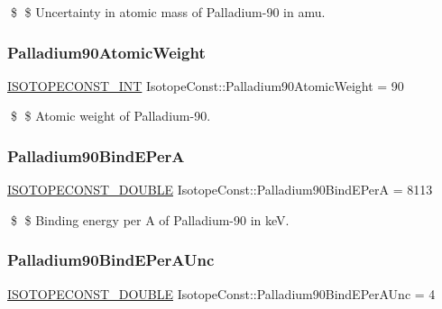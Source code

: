 \$ \$ Uncertainty in atomic mass of Palladium-\/90 in amu. \mbox{\label{group___isotope_const-_palladium-_pd90_ga247c13b93d691484c22de42ee18c9520}} 
\subsubsection{\texorpdfstring{Palladium90\+Atomic\+Weight}{Palladium90AtomicWeight}}
{\footnotesize\ttfamily \mbox{\hyperlink{group___isotope_const-_macros_ga5f18360b3e99483a35c32d789e62621c}{I\+S\+O\+T\+O\+P\+E\+C\+O\+N\+S\+T\+\_\+\+I\+NT}} Isotope\+Const\+::\+Palladium90\+Atomic\+Weight = 90}

\$ \$ Atomic weight of Palladium-\/90. \mbox{\label{group___isotope_const-_palladium-_pd90_ga45b9f9d9ab32f1104a08cf1b076faf8b}} 
\subsubsection{\texorpdfstring{Palladium90\+Bind\+E\+PerA}{Palladium90BindEPerA}}
{\footnotesize\ttfamily \mbox{\hyperlink{group___isotope_const-_macros_ga8f45a7272ce02c0b4c65c44636ed719a}{I\+S\+O\+T\+O\+P\+E\+C\+O\+N\+S\+T\+\_\+\+D\+O\+U\+B\+LE}} Isotope\+Const\+::\+Palladium90\+Bind\+E\+PerA = 8113}

\$ \$ Binding energy per A of Palladium-\/90 in keV. \mbox{\label{group___isotope_const-_palladium-_pd90_ga117388e498531058af19fc024ce61153}} 
\subsubsection{\texorpdfstring{Palladium90\+Bind\+E\+Per\+A\+Unc}{Palladium90BindEPerAUnc}}
{\footnotesize\ttfamily \mbox{\hyperlink{group___isotope_const-_macros_ga8f45a7272ce02c0b4c65c44636ed719a}{I\+S\+O\+T\+O\+P\+E\+C\+O\+N\+S\+T\+\_\+\+D\+O\+U\+B\+LE}} Isotope\+Const\+::\+Palladium90\+Bind\+E\+Per\+A\+Unc = 4}

